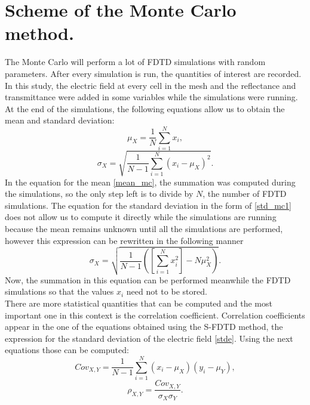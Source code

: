 \documentclass[12pt, oneside]{book}
\begin{document}
\section{Scheme of the Monte Carlo method.}
\indent The Monte Carlo will perform a lot of FDTD simulations with random parameters. After every simulation is run, the quantities of interest are recorded. In this study, the electric field at every cell in the mesh and the reflectance and transmittance were added in some variables while the simulations were running. At the end of the simulations, the following equations allow us to obtain the mean and standard deviation:
\begin{equation}\label{mean_mc}
\mu_X=\frac{1}{N} \sum_{i=1}^N x_i,
\end{equation}
\begin{equation}\label{std_mc1}
\sigma_X=\sqrt{\frac{1}{N-1}  \sum_{i=1}^N \left(x_i-\mu_X \right)^2}.
\end{equation}
In the equation for the mean \ref{mean_mc}, the summation was computed during the simulations, so the only step left is to divide by $N$, the number of FDTD simulations. The equation for the standard deviation in the form of \ref{std_mc1} does not allow us to compute it directly while the simulations are running because the mean remains unknown until all the simulations are performed, however this expression can be rewritten in the following manner
\begin{equation}
\sigma_X=\sqrt{\frac{1}{N-1} \left( \left[ \sum_{i=1}^N x_i^2  \right] - N\mu_X^2 \right)}.
\end{equation}
Now, the summation in this equation can be performed meanwhile the FDTD simulations so that the values $x_i$ need not to be stored. \\
\indent There are more statistical quantities that can be computed and the most important one in this context is the correlation coefficient. Correlation coefficients appear in the one of the equations obtained using the S-FDTD method, the expression for the standard deviation of the electric field \ref{stde}. Using the next equations those can be computed:
\begin{equation}
Cov_{X,Y}=\frac{1}{N-1} \sum_{i=1}^N \left(x_i-\mu_X\right)\left(y_i-\mu_Y\right),
\end{equation}
\begin{equation}
\rho_{X,Y}=\frac{Cov_{X,Y}}{\sigma_X \sigma_Y}.
\end{equation}
\end{document}
